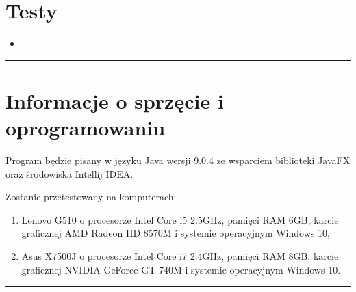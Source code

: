 \documentclass[a4paper,11pt]{article}
\newcommand{\linia}{\rule{\linewidth}{0.4mm}}
\begin{document}
\section{Testy}
\begin{itemize}
\item 
\end{itemize}

\noindent\linia
\section{Informacje o sprzęcie i oprogramowaniu}
Program będzie pisany w języku Java wersji 9.0.4 ze wsparciem biblioteki JavaFX oraz środowiska Intellij IDEA.

Zostanie przetestowany na komputerach:
\begin{enumerate}
\item Lenovo G510 o procesorze Intel Core i5 2.5GHz, pamięci RAM 6GB, karcie graficznej AMD Radeon
HD 8570M i systemie operacyjnym Windows 10,
\item Asus X7500J o procesorze Intel Core i7 2.4GHz, pamięci RAM 8GB, karcie graficznej NVIDIA GeForce GT 740M i systemie operacyjnym Windows 10. 
\end{enumerate} 
\noindent\linia
\end{document}
